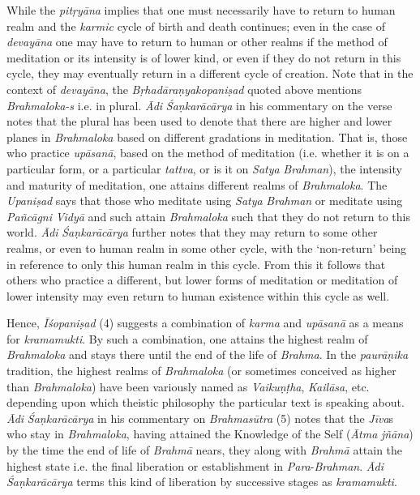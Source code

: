 While the \emph{pitṛyāna} implies that one must necessarily have to return to human realm and the \emph{karmic} cycle of birth and death continues; even in the case of \emph{devayāna} one may have to return to human or other realms if the method of meditation or its intensity is of lower kind, or even if they do not return in this cycle, they may eventually return in a different cycle of creation. Note that in the context of \emph{devayāna}, the \emph{Bṛhadāraṇyakopaniṣad} quoted above mentions \emph{Brahmaloka-s} i.e. in plural. \emph{Ādi} \emph{Śaṇkarācārya} in his commentary on the verse notes that the plural has been used to denote that there are higher and lower planes in \emph{Brahmaloka} based on different gradations in meditation. That is, those who practice \emph{upāsanā}, based on the method of meditation (i.e. whether it is on a particular form, or a particular \emph{tattva}, or is it on \emph{Satya} \emph{Brahman}), the intensity and maturity of meditation, one attains different realms of \emph{Brahmaloka}. The \emph{Upaniṣad} says that those who meditate using \emph{Satya} \emph{Brahman} or meditate using \emph{Pañcāgni} \emph{Vidyā} and such attain \emph{Brahmaloka} such that they do not return to this world. \emph{Ādi} \emph{Śaṇkarācārya} further notes that they may return to some other realms, or even to human realm in some other cycle, with the `non-return' being in reference to only this human realm in this cycle. From this it follows that others who practice a different, but lower forms of meditation or meditation of lower intensity may even return to human existence within this cycle as well.

Hence, \emph{Īśopaniṣad} (4) suggests a combination of \emph{karma} and \emph{upāsanā} as a means for \emph{kramamukti}. By such a combination, one attains the highest realm of \emph{Brahmaloka} and stays there until the end of the life of \emph{Brahma}. In the \emph{paurāṇika} tradition, the highest realms of \emph{Brahmaloka} (or sometimes conceived as higher than \emph{Brahmaloka}) have been variously named as \emph{Vaikuṇṭha}, \emph{Kailāsa}, etc. depending upon which theistic philosophy the particular text is speaking about. \emph{Ādi} \emph{Śaṇkarācārya} in his commentary on \emph{Brahmasūtra} (5) notes that the \emph{Jīva}s who stay in \emph{Brahmaloka}, having attained the Knowledge of the Self (\emph{Ātma} \emph{jñāna}) by the time the end of life of \emph{Brahmā} nears, they along with \emph{Brahmā} attain the highest state i.e. the final liberation or establishment in \emph{Para}-\emph{Brahman}. \emph{Ādi} \emph{Śaṇkarācārya} terms this kind of liberation by successive stages as \emph{kramamukti}.

